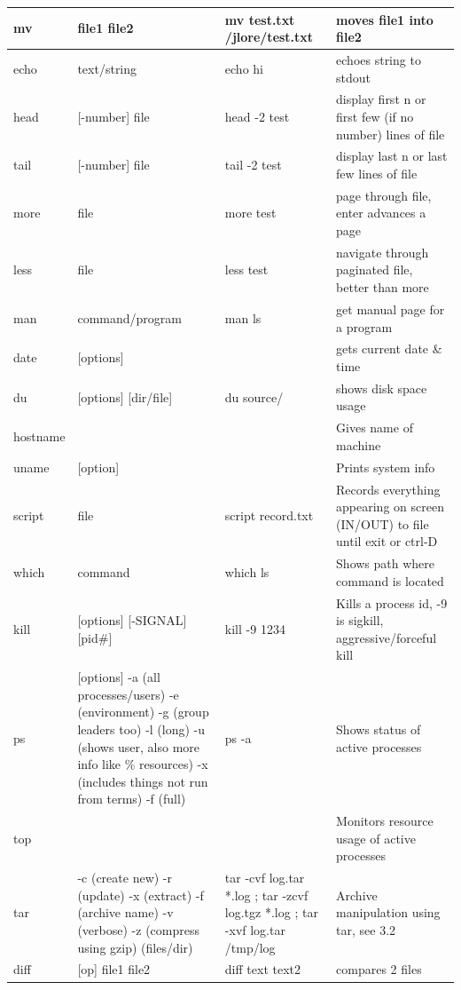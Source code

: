 \documentclass[12 pt]{article}
\begin{document}
\begin{tabularx}{\textwidth}{|X|X|X|X|}
		 \\\hline
		 mv & file1 file2 & mv test.txt /jlore/test.txt & moves file1 into file2
		 \\\hline 
		 echo & text/string & echo hi & echoes string to stdout
		 \\\hline 
		 head & [-number] file & head -2 test & display first n or first few (if no number) lines of file
		 \\\hline
		 tail & [-number] file & tail -2 test & display last n or last few lines of file
		 \\\hline 
		 more & file & more test & page through file, enter advances a page
		 \\\hline 
		 less & file & less test & navigate through paginated file, better than more
		 \\\hline 
		 man & command/program & man ls & get manual page for a program
		 \\\hline
		 date & [options] & & gets current date \& time
		 \\\hline 
		 du & [options] [dir/file] & du source/ & shows disk space usage
		 \\\hline 
		 hostname &&& Gives name of machine
		 \\\hline 
		 uname & [option] && Prints system info
		 \\\hline 
		 script & file & script record.txt & Records everything appearing on screen (IN/OUT) to file until exit or ctrl-D
		 \\\hline 
		 which & command & which ls & Shows path where command is located
		 \\\hline
		 kill & [options] [-SIGNAL] [pid\#] & kill -9 1234 & Kills a process id, -9 is sigkill, aggressive/forceful kill
		 \\\hline 
		 ps & [options] -a (all processes/users) -e (environment) -g (group leaders too) -l (long) -u (shows user, also more info like \% resources) -x (includes things not run from terms) -f (full)& ps -a & Shows status of active processes
		 \\\hline 
		 top & && Monitors resource usage of active processes
		 \\\hline
		 tar & -c (create new) -r (update) -x (extract) -f (archive name) -v (verbose) -z (compress using gzip) (files/dir)& tar -cvf log.tar *.log ; tar -zcvf log.tgz *.log ; tar -xvf log.tar /tmp/log & Archive manipulation using tar, see 3.2
		 \\\hline
		 diff & [op] file1 file2 & diff text text2 & compares 2 files
		 \\\hline

\end{tabularx}
\end{document}
